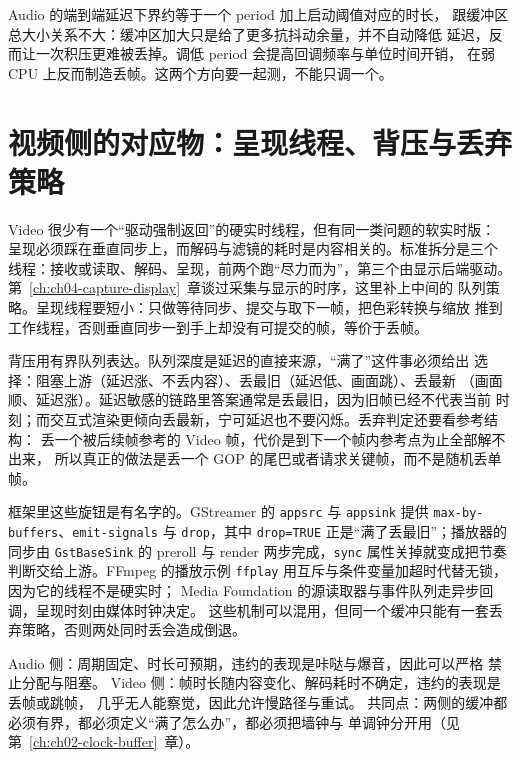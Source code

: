 \documentclass[12pt,a4paper,fontset=fandol]{ctexbook}
\newcommand{\Tp}[1]{\texttt{#1}}
\newcommand{\Lang}[1]{\textsf{#1}}
\newcommand{\DomAud}{\Lang{Audio}}
\newcommand{\DomVid}{\Lang{Video}}
\begin{document}
\begin{note}[title={周期、缓冲与延迟不是同一件事}]
\DomAud{} 的端到端延迟下界约等于一个 period 加上启动阈值对应的时长，
跟缓冲区总大小关系不大：缓冲区加大只是给了更多抗抖动余量，并不自动降低
延迟，反而让一次积压更难被丢掉。调低 period 会提高回调频率与单位时间开销，
在弱 CPU 上反而制造丢帧。这两个方向要一起测，不能只调一个。
\end{note}

\section{视频侧的对应物：呈现线程、背压与丢弃策略}

\DomVid{} 很少有一个``驱动强制返回''的硬实时线程，但有同一类问题的软实时版：
呈现必须踩在垂直同步上，而解码与滤镜的耗时是内容相关的。标准拆分是三个
线程：接收或读取、解码、呈现，前两个跑``尽力而为''，第三个由显示后端驱动。
第~\ref{ch:ch04-capture-display}~章谈过采集与显示的时序，这里补上中间的
队列策略。呈现线程要短小：只做等待同步、提交与取下一帧，把色彩转换与缩放
推到工作线程，否则垂直同步一到手上却没有可提交的帧，等价于丢帧。

背压用有界队列表达。队列深度是延迟的直接来源，``满了''这件事必须给出
选择：阻塞上游（延迟涨、不丢内容）、丢最旧（延迟低、画面跳）、丢最新
（画面顺、延迟涨）。延迟敏感的链路里答案通常是丢最旧，因为旧帧已经不代表当前
时刻；而交互式渲染更倾向丢最新，宁可延迟也不要闪烁。丢弃判定还要看参考结构：
丢一个被后续帧参考的 \DomVid{} 帧，代价是到下一个帧内参考点为止全部解不出来，
所以真正的做法是丢一个 GOP 的尾巴或者请求关键帧，而不是随机丢单帧。

框架里这些旋钮是有名字的。GStreamer 的 \Tp{appsrc} 与 \Tp{appsink} 提供
\Tp{max-by-buffers}、\Tp{emit-signals} 与 \Tp{drop}，其中 \Tp{drop=TRUE}
正是``满了丢最旧''；播放器的同步由 \Tp{GstBaseSink} 的 preroll 与 render
两步完成，\Tp{sync} 属性关掉就变成把节奏判断交给上游。FFmpeg 的播放示例
\Tp{ffplay} 用互斥与条件变量加超时代替无锁，因为它的线程不是硬实时；
Media Foundation 的源读取器与事件队列走异步回调，呈现时刻由媒体时钟决定。
这些机制可以混用，但同一个缓冲只能有一套丢弃策略，否则两处同时丢会造成倒退。

\begin{compare}[title={音频与视频实时契约的差异}]
\DomAud{} 侧：周期固定、时长可预期，违约的表现是咔哒与爆音，因此可以严格
禁止分配与阻塞。
\DomVid{} 侧：帧时长随内容变化、解码耗时不确定，违约的表现是丢帧或跳帧，
几乎无人能察觉，因此允许慢路径与重试。
共同点：两侧的缓冲都必须有界，都必须定义``满了怎么办''，都必须把墙钟与
单调钟分开用（见第~\ref{ch:ch02-clock-buffer}~章）。
\end{compare}
\end{document}

